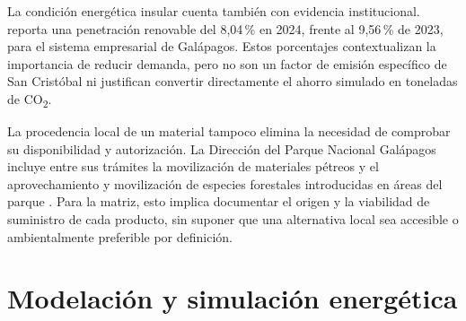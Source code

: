 La condición energética insular cuenta también con evidencia institucional. \textcite{elecgalapagosRendicion2024} reporta una penetración renovable del 8,04\,\% en 2024, frente al 9,56\,\% de 2023, para el sistema empresarial de Galápagos. Estos porcentajes contextualizan la importancia de reducir demanda, pero no son un factor de emisión específico de San Cristóbal ni justifican convertir directamente el ahorro simulado en toneladas de CO\textsubscript{2}.

La procedencia local de un material tampoco elimina la necesidad de comprobar su disponibilidad y autorización. La Dirección del Parque Nacional Galápagos incluye entre sus trámites la movilización de materiales pétreos y el aprovechamiento y movilización de especies forestales introducidas en áreas del parque \parencite{pngPermisosRecursos}. Para la matriz, esto implica documentar el origen y la viabilidad de suministro de cada producto, sin suponer que una alternativa local sea accesible o ambientalmente preferible por definición.

\section{Modelación y simulación energética}

